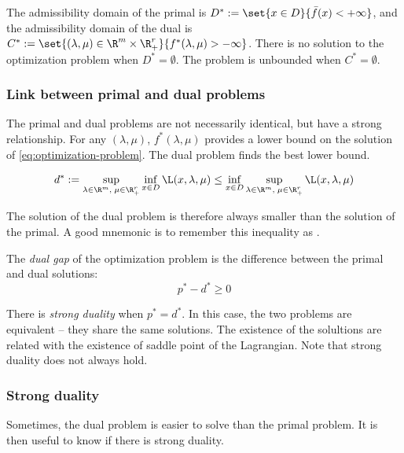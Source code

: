 \documentclass{../cs-classes/cs-classes}
\begin{document}
The admissibility domain of the primal is $D^* := \set{x\in D}{\bar{f}(x)<+\infty}$, and the admissibility domain of the dual is $C^* := \set{(\lambda, \mu)\in\R^m\times\R_+^r}{f^*(\lambda, \mu)>-\infty}$. There is no solution to the optimization problem when $D^*=\emptyset$. The problem is unbounded when $C^*=\emptyset$.

\subsubsection{Link between primal and dual problems}
The primal and dual problems are not necessarily identical, but have a strong relationship. For any $(\lambda, \mu)$, $f^*(\lambda, \mu)$ provides a lower bound on the solution of \eqref{eq:optimization-problem}. The dual problem finds the best lower bound.

\begin{property}
    \begin{equation*}
        d^* := \sup_{\lambda\in\R^m, \;\mu\in\R^r_+} \inf_{x\in D}\L(x, \lambda, \mu) \leq \inf_{x\in D} \sup_{\lambda\in\R^m, \;\mu\in\R^r_+} \L(x, \lambda, \mu)
    \end{equation*}    
\end{property}
The solution of the dual problem is therefore always smaller than the solution of the primal. A good mnemonic is to remember this inequality as .

\begin{definition}
    The \emph{dual gap} of the optimization problem is the difference between the primal and dual solutions:
    \begin{equation*}
        p^*-d^* \geq 0
    \end{equation*}
\end{definition}

\begin{definition}
    There is \emph{strong duality} when $p^*=d^*$. In this case, the two problems are equivalent -- they share the same solutions. The existence of the solultions are related with the existence of saddle point of the Lagrangian. Note that strong duality does not always hold.
\end{definition}

\subsubsection{Strong duality}
Sometimes, the dual problem is easier to solve than the primal problem. It is then useful to know if there is strong duality.
\end{document}
